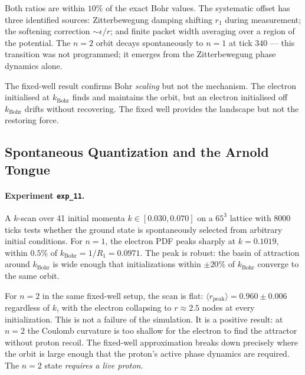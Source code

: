 Both ratios are within $10\%$ of the exact Bohr values.
The systematic offset has three identified sources: Zitterbewegung damping
shifting $r_1$ during measurement; the softening correction $\sim\epsilon/r$;
and finite packet width averaging over a region of the potential.
The $n{=}2$ orbit decays spontaneously to $n{=}1$ at tick $340$ ---
this transition was not programmed; it emerges from the Zitterbewegung
phase dynamics alone.

The fixed-well result confirms Bohr \emph{scaling} but not the mechanism.
The electron initialised at $k_\text{Bohr}$ finds and maintains the orbit,
but an electron initialised off $k_\text{Bohr}$ drifts without recovering.
The fixed well provides the landscape but not the restoring force.

\subsection{Spontaneous Quantization and the Arnold Tongue}
\label{subsec:exp11}

\paragraph{Experiment \texttt{exp\_11}.}
A $k$-scan over 41 initial momenta $k \in [0.030, 0.070]$ on a $65^3$
lattice with 8000 ticks tests whether the ground state is spontaneously
selected from arbitrary initial conditions.
For $n{=}1$, the electron PDF peaks sharply at $k = 0.1019$,
within $0.5\%$ of $k_\text{Bohr} = 1/R_1 = 0.0971$.
The peak is robust: the basin of attraction around $k_\text{Bohr}$ is
wide enough that initializations within $\pm 20\%$ of $k_\text{Bohr}$
converge to the same orbit.

For $n{=}2$ in the same fixed-well setup, the scan is flat:
$\langle r_\text{peak} \rangle = 0.960 \pm 0.006$ regardless of $k$,
with the electron collapsing to $r \approx 2.5$ nodes at every
initialization.
This is not a failure of the simulation.
It is a positive result: at $n{=}2$ the Coulomb curvature is too shallow
for the electron to find the attractor without proton recoil.
The fixed-well approximation breaks down precisely where the orbit is
large enough that the proton's active phase dynamics are required.
The $n{=}2$ state \emph{requires a live proton}.

